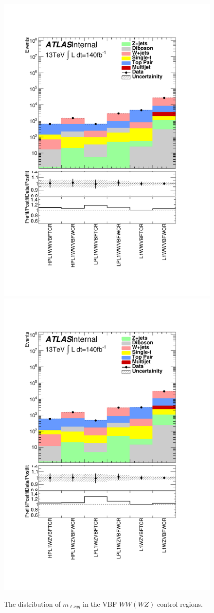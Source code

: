 \begin{figure}[h!]
  \centering
  \includegraphics[width=0.48\hsize]{figures/results/HVTWWVBF/PlotyieldTable_postfit.pdf}
    \includegraphics[width=0.48\hsize]{figures/results/HVTWZVBF/PlotyieldTable_postfit.pdf}
 \caption{The distribution of $m_{\ell\nu qq}$ in the VBF $WW(WZ)$ control regions.} 
  \label{fig:hvtwwvbf_cr_postfit}
\end{figure} 
\FloatBarrier



